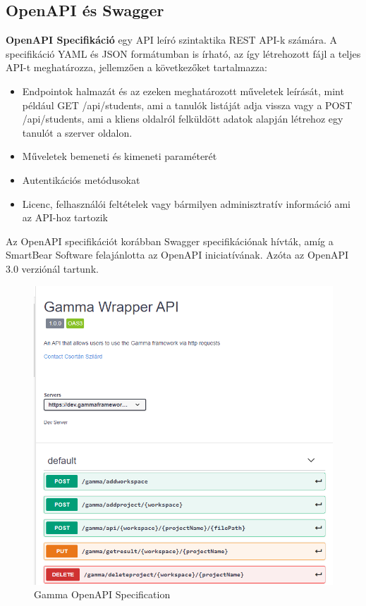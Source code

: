 \subsection{OpenAPI és Swagger}
\textbf{OpenAPI Specifikáció} \cite{swagger} egy API leíró szintaktika REST API-k számára. A specifikáció YAML és JSON formátumban is írható, az így létrehozott fájl a teljes API-t meghatározza, jellemzően a következőket tartalmazza:
\begin{itemize}
	\item Endpointok halmazát és az ezeken meghatározott műveletek leírását, mint például GET /api/students, ami a tanulók listáját adja vissza vagy a POST /api/students, ami a kliens oldalról felküldött adatok alapján létrehoz egy tanulót a szerver oldalon.
	\item Műveletek bemeneti és kimeneti paraméterét
	\item Autentikációs metódusokat
	\item Licenc, felhasználói feltételek vagy bármilyen adminisztratív információ ami az API-hoz tartozik
\end{itemize}

Az OpenAPI specifikációt korábban Swagger specifikációnak hívták, amíg a SmartBear Software felajánlotta az OpenAPI iniciatívának. Azóta az OpenAPI 3.0 verziónál tartunk.

\begin{figure}[!ht]
	\includegraphics[width=150mm, keepaspectratio]{figures/swagerr_UI.png}
	\caption{Gamma OpenAPI Specification}
	\label{fig:openAPI_swagger}
\end{figure}

